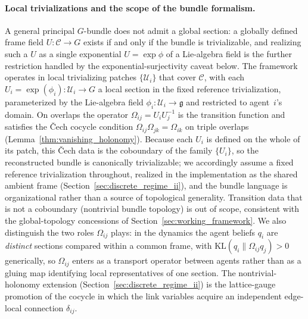 \documentclass[11pt]{article}
\begin{document}
\paragraph{Local trivializations and the scope of the bundle formalism.}
\label{sec:local_trivialization}
A general principal $G$-bundle does not admit a global section: a globally defined frame field $U: \mathcal{C} \to G$ exists if and only if the bundle is trivializable, and realizing such a $U$ as a single exponential $U = \exp\phi$ of a Lie-algebra field is the further restriction handled by the exponential-surjectivity caveat below. The framework operates in local trivializing patches $\{\mathcal{U}_i\}$ that cover $\mathcal{C}$, with each $U_i = \exp(\phi_i): \mathcal{U}_i \to G$ a local section in the fixed reference trivialization, parameterized by the Lie-algebra field $\phi_i: \mathcal{U}_i \to \mathfrak{g}$ and restricted to agent~$i$'s domain. On overlaps the operator $\Omega_{ij} = U_iU_j^{-1}$ is the transition function and satisfies the \v{C}ech cocycle condition $\Omega_{ij}\Omega_{jk} = \Omega_{ik}$ on triple overlaps (Lemma~\ref{thm:vanishing_holonomy}). Because each $U_i$ is defined on the whole of its patch, this \v{C}ech data is the coboundary of the family $\{U_i\}$, so the reconstructed bundle is canonically trivializable; we accordingly assume a fixed reference trivialization throughout, realized in the implementation as the shared ambient frame (Section~\ref{sec:discrete_regime_ii}), and the bundle language is organizational rather than a source of topological generality. Transition data that is not a coboundary (nontrivial bundle topology) is out of scope, consistent with the global-topology concessions of Section~\ref{sec:working_framework}. We also distinguish the two roles $\Omega_{ij}$ plays: in the dynamics the agent beliefs $q_i$ are \emph{distinct} sections compared within a common frame, with $\mathrm{KL}(q_i \| \Omega_{ij} q_j) > 0$ generically, so $\Omega_{ij}$ enters as a transport operator between agents rather than as a gluing map identifying local representatives of one section. The nontrivial-holonomy extension (Section~\ref{sec:discrete_regime_ii}) is the lattice-gauge promotion of the cocycle in which the link variables acquire an independent edge-local connection $\delta_{ij}$.
\end{document}

